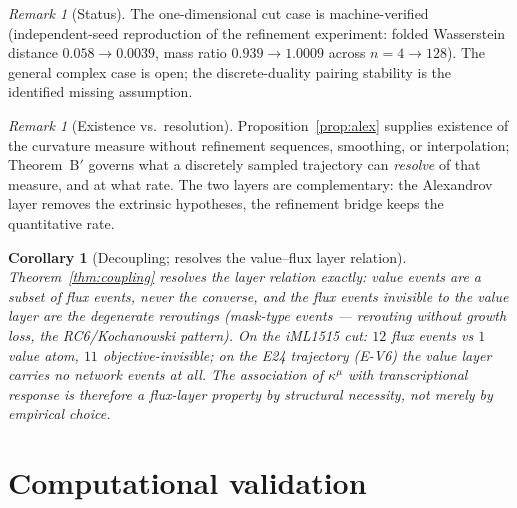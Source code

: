 \documentclass[11pt,a4paper]{article}
\theoremstyle{plain}
\newtheorem{corollary}[theorem]{Corollary}
\theoremstyle{definition}
\theoremstyle{remark}
\newtheorem{remark}[theorem]{Remark}
\newcommand{\kmu}{\kappa^{\mu}}
\begin{document}
\begin{remark}[Status]
The one-dimensional cut case is machine-verified (independent-seed
reproduction of the refinement experiment: folded Wasserstein distance
$0.058 \to 0.0039$, mass ratio $0.939 \to 1.0009$ across
$n = 4 \to 128$). The general complex case is open; the discrete-duality
pairing stability is the identified missing assumption.
\end{remark}

\begin{remark}[Existence vs.\ resolution]
Proposition~\ref{prop:alex} supplies existence of the curvature measure
without refinement sequences, smoothing, or interpolation; Theorem~B$'$
governs what a discretely sampled trajectory can \emph{resolve} of that
measure, and at what rate. The two layers are complementary: the
Alexandrov layer removes the extrinsic hypotheses, the refinement
bridge keeps the quantitative rate.
\end{remark}

\begin{corollary}[Decoupling; resolves the value--flux layer
relation]\label{conj:valueflux}
Theorem~\ref{thm:coupling} resolves the layer relation exactly: value
events are a subset of flux events, never the converse, and the flux
events invisible to the value layer are the degenerate reroutings
(mask-type events --- rerouting without growth loss, the
RC6/Kochanowski pattern). On the iML1515 cut: $12$ flux events vs $1$
value atom, $11$ objective-invisible; on the E24 trajectory (E-V6) the
value layer carries no network events at all. The association of
$\kmu$ with transcriptional response is therefore a flux-layer
property by structural necessity, not merely by empirical choice.
\end{corollary}

\section{Computational validation}\label{sec:computational}

\end{document}
